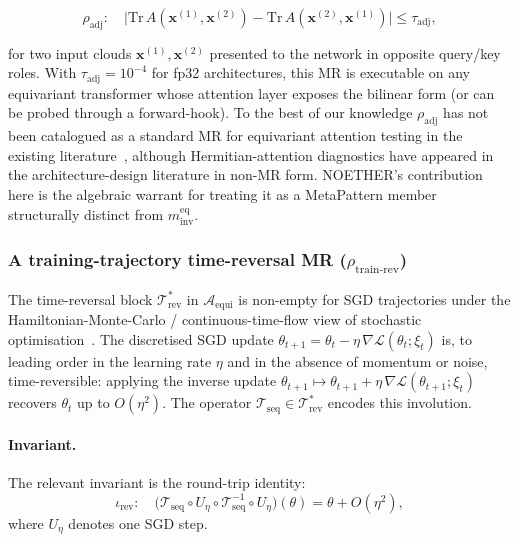 \documentclass[manuscript]{acmart}
\begin{document}
\begin{equation}
\rho_{\mathrm{adj}}: \quad \big| \mathrm{Tr}\,A(\mathbf{x}^{(1)}, \mathbf{x}^{(2)}) - \mathrm{Tr}\,A(\mathbf{x}^{(2)}, \mathbf{x}^{(1)}) \big| \le \tau_{\mathrm{adj}},
\end{equation}

\noindent for two input clouds $\mathbf{x}^{(1)}, \mathbf{x}^{(2)}$ presented to the network in opposite query/key roles. With $\tau_{\mathrm{adj}} = 10^{-4}$ for fp32 architectures, this MR is executable on any equivariant transformer whose attention layer exposes the bilinear form (or can be probed through a forward-hook). To the best of our knowledge $\rho_{\mathrm{adj}}$ has not been catalogued as a standard MR for equivariant attention testing in the existing literature~\cite{Segura2016, MRScout2024, GenMorph2024}, although Hermitian-attention diagnostics have appeared in the architecture-design literature in non-MR form. NOETHER's contribution here is the algebraic warrant for treating it as a MetaPattern member structurally distinct from $m^{\mathrm{eq}}_{\mathrm{inv}}$.

\subsubsection{A training-trajectory time-reversal MR (\texorpdfstring{$\rho_{\mathrm{train\text{-}rev}}$}{rho\_train-rev})}
\label{subsec:rho-rev}

The time-reversal block $\mathcal{T}^{*}_{\mathrm{rev}}$ in $\mathcal{A}_{\mathrm{equi}}$ is non-empty for SGD trajectories under the Hamiltonian-Monte-Carlo / continuous-time-flow view of stochastic optimisation~\cite{Chen2014SGHMC}. The discretised SGD update $\theta_{t+1} = \theta_t - \eta\,\nabla\mathcal{L}(\theta_t; \xi_t)$ is, to leading order in the learning rate $\eta$ and in the absence of momentum or noise, time-reversible: applying the inverse update $\theta_{t+1} \mapsto \theta_{t+1} + \eta\,\nabla\mathcal{L}(\theta_{t+1}; \xi_t)$ recovers $\theta_t$ up to $O(\eta^2)$. The operator $\mathcal{T}_{\mathrm{seq}} \in \mathcal{T}^{*}_{\mathrm{rev}}$ encodes this involution.

\paragraph{Invariant.} The relevant invariant is the round-trip identity:
$$\iota_{\mathrm{rev}}: \quad \big(\mathcal{T}_{\mathrm{seq}} \circ U_{\eta} \circ \mathcal{T}_{\mathrm{seq}}^{-1} \circ U_{\eta}\big)(\theta) = \theta + O(\eta^2),$$
where $U_{\eta}$ denotes one SGD step.
\end{document}
